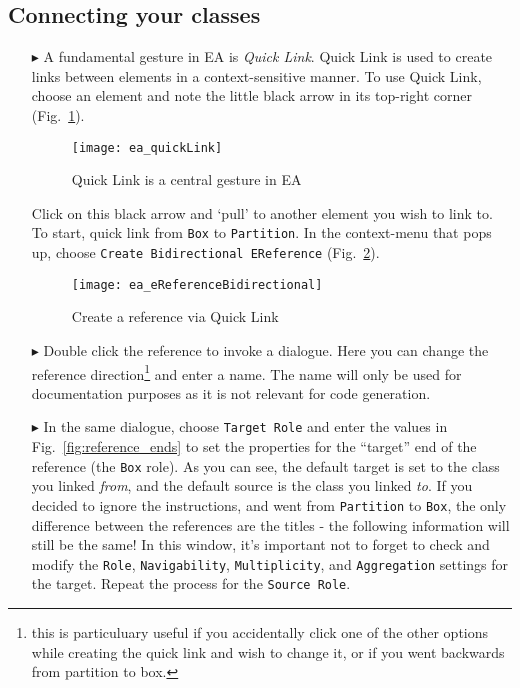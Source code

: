 \newpage
\subsection{Connecting your classes}
\visHeader
\hypertarget{static:references vis}{}

\begin{itemize}

\item[$\blacktriangleright$] A fundamental gesture in EA is \emph{Quick Link}. Quick Link is used to create links between elements in a context-sensitive
manner. To use Quick Link, choose an element and note the little black arrow in its top-right corner (Fig.~\ref{fig:quicklink}).

\begin{figure}[htbp]
	\centering
  \texttt{[image: ea\_quickLink]}
	\caption{Quick Link is a central gesture in EA}
	\label{fig:quicklink}
\end{figure}
\FloatBarrier

Click on this black arrow and `pull' to another element you wish to link to. To start, quick link from \texttt{Box} to \texttt{Partition}. In the context-menu
that pops up, choose \texttt{Create Bidirectional EReference} (Fig.~\ref{fig:ereference}).

\begin{figure}[htbp]
	\centering
  \texttt{[image: ea\_eReferenceBidirectional]}
	\caption{Create a reference via Quick Link}
	\label{fig:ereference}
\end{figure}
\FloatBarrier

\item[$\blacktriangleright$] Double click the reference to invoke a dialogue. Here you can change the reference direction\footnote{this is particuluary useful
if you accidentally click one of the other options while creating the quick link and wish to change it, or if you went backwards from partition to box.} and
enter a name. The name will only be used for documentation purposes as it is not relevant for code generation.

\item[$\blacktriangleright$] In the same dialogue, choose \texttt{Target Role} and enter the values in Fig.~\ref{fig:reference_ends} to set the properties for
the ``target'' end of the reference (the \texttt{Box} role). As you can see, the default target is set to the class you linked \emph{from}, and the default
source is the class you linked \emph{to}. If you decided to ignore the instructions, and went from \texttt{Partition} to \texttt{Box}, the only difference
between the references are the titles - the following information will still be the same! In this window, it's important not to forget to check and modify the
\texttt{Role}, \texttt{Navigability}, \texttt{Multiplicity}, and \texttt{Aggregation} settings for the target.  Repeat the process for the \texttt{Source Role}.



\end{itemize}
